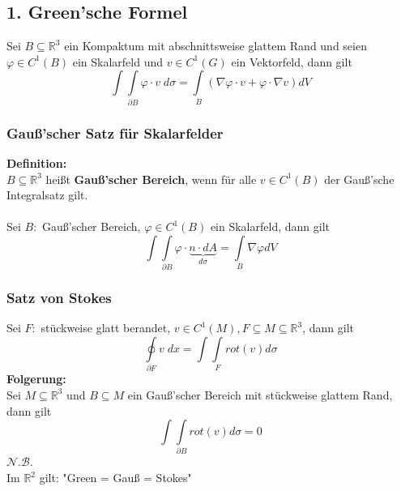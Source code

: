 \documentclass[a4paper,twocolumn,10pt]{article}
\begin{document}
\subsection{1. Green'sche Formel}
Sei $B\subseteq\mathbb{R}^3$ ein Kompaktum mit abschnittsweise glattem Rand und seien $\varphi\in C^1(B)$ ein Skalarfeld und $v\in C^1(G)$ ein Vektorfeld, dann gilt
\begin{equation*}
\int\int\limits_{\partial B}\varphi\cdot v\;d\sigma=\int\limits_{B}(\nabla\varphi\cdot v+\varphi\cdot \nabla v)dV
\end{equation*}

\subsubsection{Gauß'scher Satz für Skalarfelder}
\textbf{Definition:}\\
$B\subseteq\mathbb{R}^3$ heißt \textbf{Gauß'scher Bereich}, wenn für alle $v\in C^1(B)$ der Gauß'sche Integralsatz gilt.\\\\
Sei $B:$ Gauß'scher Bereich, $\varphi\in C^1(B)$ ein Skalarfeld, dann gilt
\begin{equation*}
\int\int\limits_{\partial B}\varphi\cdot \underbrace{n\cdot dA}_{d\sigma}=\int\limits_{B}\nabla\varphi dV
\end{equation*}

\subsubsection{Satz von Stokes}
Sei $F:$ stückweise glatt berandet, $v\in C^1(M), F\subseteq M\subseteq\mathbb{R}^3$, dann gilt
\begin{equation*}
\oint\limits_{\partial F}v\;dx=\int\int\limits_{F}rot(v)d\sigma
\end{equation*}
\textbf{Folgerung:}\\
Sei $M\subseteq\mathbb{R}^3$ und $B\subseteq M$ ein Gauß'scher Bereich mit stückweise glattem Rand, dann gilt
\begin{equation*}
\int\int\limits_{\partial B}rot(v)d\sigma=0
\end{equation*}
$\mathcal{N.B.}$\\
Im $\mathbb{R}^2$ gilt: "Green = Gauß = Stokes"
\end{document}
